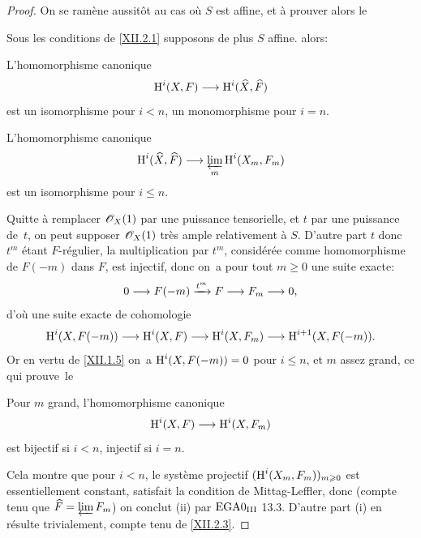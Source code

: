 \begin{proof}
On se ram\`ene aussit\^{o}t au cas o\`u $S$ est affine, et \`a prouver alors le

\begin{corollaire} \label{XII.2.2}
Sous les conditions de \ref{XII.2.1} supposons de plus $S$ affine. alors:
\begin{enumeratei}
\item
L'homomorphisme canonique
\[
\H^i(X, F) \to \H^i(\widehat{X}, \widehat{F})
\]
est un isomorphisme pour $i<n$, un monomorphisme pour $i=n$.
\item
L'homomorphisme canonique
\[
\H^i(\widehat{X}, \widehat{F}) \to \varprojlim_m \H^i(X_m, F_m)
\]
est un isomorphisme pour $i\leq n$.
\end{enumeratei}
\end{corollaire}

Quitte \`a remplacer $\mathscr{O}_X(1)$ par une puissance tensorielle, et $t$ par une puissance de~$t$, on peut supposer $\mathscr{O}_X(1)$ tr\`es ample relativement \`a $S$. D'autre part $t$ donc $t^m$ \'etant $F$-r\'egulier, la multiplication par $t^m$, consid\'er\'ee comme homomorphisme de $F(-m)$ dans $F$, est injectif, donc on~a pour tout $m\geq 0$ une suite exacte:
\steco
\begin{equation} \label{eq:XII.14}
0\to F(-m) \lto{t^m} F \to F_m \to0,
\end{equation}
d'o\`u une suite exacte de cohomologie
\[
\H^i(X, F(-m)) \to \H^i(X, F) \to \H^i(X, F_m) \to \H^{i+1}(X, F(-m)).
\]
Or en vertu de \ref{XII.1.5} on~a $\operatorname{H}^i(X, F(-m))=0$ pour $i\leq n$, et $m$ assez grand, ce qui prouve~le

\begin{lemme} \label{XII.2.3}
Pour $m$ grand, l'homomorphisme canonique
\[
\H^i(X, F) \to \H^i(X, F_m)
\]
est bijectif si $i<n$, injectif si $i=n$.
\end{lemme}

\enlargethispage{-2\baselineskip}%
Cela montre que pour $i<n$, le syst\`eme projectif $(\operatorname{H}^i(X_m, F_m))_{m\geqslant 0}$ est essentiellement constant, \afortiori satisfait la condition de Mittag-Leffler, donc (compte tenu que $\widehat{F}= \varprojlim F_m$) on conclut (ii) par $\textup{EGA}\space 0_{\textup{III}}$ 13.3. D'autre part (i) en r\'esulte trivialement, compte tenu de \ref{XII.2.3}.


\end{proof}
